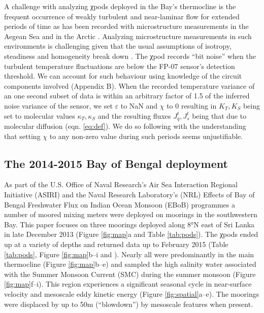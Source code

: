 \documentclass[onecol]{ametsoc}
\begin{document}
A challenge with analyzing χpods deployed in the Bay's thermocline is the frequent occurrence of weakly turbulent and near-laminar flow for extended periods of time as has been recorded with microstructure measurements in the Aegean Sea \citep{Gregg2012} and in the Arctic \citep{Scheifele2018}.
Analyzing microstructure measurements in such environments is challenging given that the usual assumptions of isotropy, steadiness and homogeneity break down \citep{Rohr1988,Itsweire1993,Gargett1984a}.
The χpod records ``bit noise'' when the turbulent temperature fluctuations are below the FP-07 sensor's detection threshold.
We can account for such behaviour using knowledge of the  circuit components involved (Appendix B).
When the recorded temperature variance of an one second subset of data is within an arbitrary factor of 1.5 of the inferred noise variance of the sensor, we set \(ε\) to NaN and \(χ\) to 0 resulting in \(K_T, K_S\)  being set to molecular values \(κ_T, κ_S\) and the resulting fluxes \(J_q^t, J_s^t\) being that due to molecular diffusion (eqn. \ref{eq:def}).
We do so following \cite{Gregg2012} with the understanding that setting \(χ\) to any non-zero value during such periods seems unjustifiable.


\subsection{The 2014-2015 Bay of Bengal deployment}
\label{sec:org46e574a}

As part of the U.S. Office of Naval Research's Air Sea Interaction Regional Initiative (ASIRI) and the Naval Research Laboratory's (NRL) Effects of Bay of Bengal Freshwater Flux on Indian Ocean Monsoon (EBoB) programmes a number of moored mixing meters  \citep[χpods,][]{Moum2009a} were deployed on moorings in the southwestern Bay.
This paper focuses on three moorings deployed along 8°N east of Sri Lanka in late December 2013 (Figure \ref{fig:map}a and Table \ref{tab:pods}).
The χpods ended up at a variety of depths and returned data up to February 2015 (Table \ref{tab:pods}, Figure \ref{fig:map}b--i and \citealp{Wijesekera2016a}).
Nearly all were predominantly in the main thermocline (Figure \ref{fig:map}b--e) and sampled the high salinity water associated with the Summer Monsoon Current (SMC) during the summer monsoon (Figure \ref{fig:map}f--i).
This region experiences a significant seasonal cycle in near-surface velocity and mesoscale eddy kinetic energy (Figure \ref{fig:spatial}a--e).
The moorings were displaced by up to 50m (``blowdown'') by mesoscale features when present.
\end{document}
